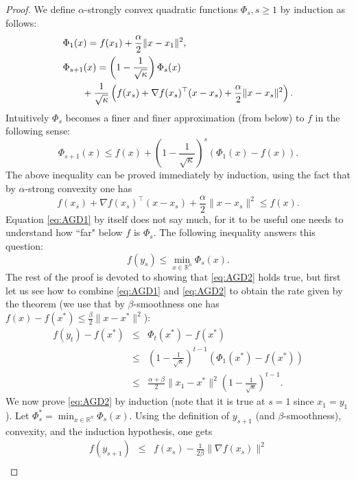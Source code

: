 \begin{proof}
We define $\alpha$-strongly convex quadratic functions $\Phi_s, s \geq 1$ by induction as follows:
\begin{align}
& \Phi_1(x) = f(x_1) + \frac{\alpha}{2} \|x-x_1\|^2 , \notag \\
& \Phi_{s+1}(x) = \left(1 - \frac{1}{\sqrt{\kappa}}\right) \Phi_s(x) \notag \\
& \qquad + \frac{1}{\sqrt{\kappa}} \left(f(x_s) + \nabla f(x_s)^{\top} (x-x_s) + \frac{\alpha}{2} \|x-x_s\|^2 \right). \label{eq:AGD0}
\end{align}
Intuitively $\Phi_s$ becomes a finer and finer approximation (from below) to $f$ in the following sense:
\begin{equation} \label{eq:AGD1}
\Phi_{s+1}(x) \leq f(x) + \left(1 - \frac{1}{\sqrt{\kappa}}\right)^s (\Phi_1(x) - f(x)). 
\end{equation}
The above inequality can be proved immediately by induction, using the fact that by $\alpha$-strong convexity one has
$$f(x_s) + \nabla f(x_s)^{\top} (x-x_s) + \frac{\alpha}{2} \|x-x_s\|^2 \leq f(x) .$$
Equation \eqref{eq:AGD1} by itself does not say much, for it to be useful one needs to understand how ``far" below $f$ is $\Phi_s$. The following inequality answers this question:
\begin{equation} \label{eq:AGD2}
f(y_s) \leq \min_{x \in \mathbb{R}^n} \Phi_s(x) . 
\end{equation}
The rest of the proof is devoted to showing that \eqref{eq:AGD2} holds true, but first let us see how to combine \eqref{eq:AGD1} and \eqref{eq:AGD2} to obtain the rate given by the theorem (we use that by $\beta$-smoothness one has $f(x) - f(x^*) \leq \frac{\beta}{2} \|x-x^*\|^2$):
\begin{eqnarray*}
f(y_t) - f(x^*) & \leq & \Phi_t(x^*) - f(x^*) \\
& \leq & \left(1 - \frac{1}{\sqrt{\kappa}}\right)^{t-1} (\Phi_1(x^*) - f(x^*)) \\
& \leq & \frac{\alpha + \beta}{2} \|x_1-x^*\|^2 \left(1 - \frac{1}{\sqrt{\kappa}}\right)^{t-1} .
\end{eqnarray*}
We now prove \eqref{eq:AGD2} by induction (note that it is true at $s=1$ since $x_1=y_1$). Let $\Phi_s^* = \min_{x \in \mathbb{R}^n} \Phi_s(x)$. Using the definition of $y_{s+1}$ (and $\beta$-smoothness), convexity, and the induction hypothesis, one gets
\begin{eqnarray*}
f(y_{s+1}) & \leq & f(x_s) - \frac{1}{2 \beta} \| \nabla f(x_s) \|^2 \\

\end{eqnarray*}
\end{proof}
